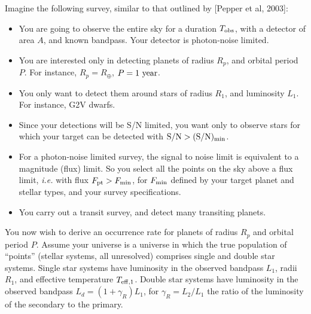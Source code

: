 \documentclass{emulateapj}
\begin{document}
Imagine the following survey, similar to that outlined by [Pepper et al, 2003]:
\begin{itemize}
\item You are going to observe the entire sky for a duration $T_{\rm obs}$, 
with a detector of area $A$, and known bandpass. Your detector is photon-noise 
limited.
%
\item You are interested only in detecting planets of radius $R_p$, and orbital 
period $P$. For instance, $R_p=R_\oplus$, $P={\rm 1\ year}$.
%
\item You only want to detect them around stars of radius $R_1$, and luminosity 
$L_1$. For instance, G2V dwarfs.
%
\item Since your detections will be S/N limited, you want only to observe stars 
for which your target can be detected with ${\rm S/N} > {\rm (S/N)_{min}}$.
%
\item For a photon-noise limited survey, the signal to noise limit is 
equivalent to a magnitude (flux) limit. So you select all the points on the sky 
above a flux limit, \textit{i.e.} with flux $F_{\rm pt} > F_{\rm min}$, for 
$F_{\rm min}$ defined by your target planet and stellar types, and your survey 
specifications.
%
\item You carry out a transit survey, and detect many transiting planets.
\end{itemize}

You now wish to derive an occurrence rate for planets of radius $R_p$ and 
orbital period $P$.
Assume your universe is a universe in which
the true population of ``points'' (stellar systems, all unresolved) 
comprises single and double star systems. 
Single star systems have 
luminosity in the observed bandpass $L_1$, radii $R_1$, and effective 
temperature $T_{\rm eff,1}$.
Double star systems have luminosity in the observed bandpass $L_d = 
(1+\gamma_R)L_1$, for $\gamma_R = L_2/L_1$ the ratio of the luminosity of 
the secondary to the primary.
\end{document}
